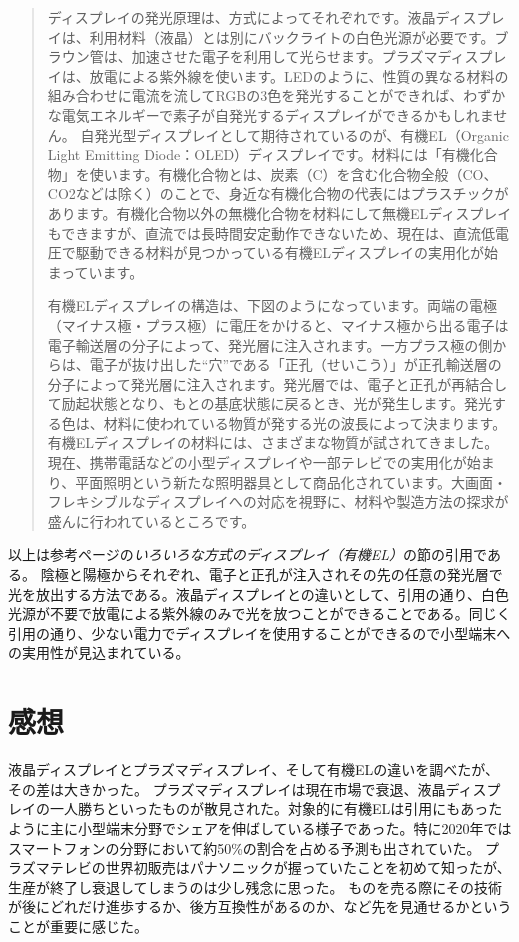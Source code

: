 \documentclass[uplatex]{jsarticle} %
\begin{document}
\begin{quotation}

  ディスプレイの発光原理は、方式によってそれぞれです。液晶ディスプレイは、利用材料（液晶）とは別にバックライトの白色光源が必要です。ブラウン管は、加速させた電子を利用して光らせます。プラズマディスプレイは、放電による紫外線を使います。LEDのように、性質の異なる材料の組み合わせに電流を流してRGBの3色を発光することができれば、わずかな電気エネルギーで素子が自発光するディスプレイができるかもしれません。
自発光型ディスプレイとして期待されているのが、有機EL（Organic Light Emitting Diode：OLED）ディスプレイです。材料には「有機化合物」を使います。有機化合物とは、炭素（C）を含む化合物全般（CO、CO2などは除く）のことで、身近な有機化合物の代表にはプラスチックがあります。有機化合物以外の無機化合物を材料にして無機ELディスプレイもできますが、直流では長時間安定動作できないため、現在は、直流低電圧で駆動できる材料が見つかっている有機ELディスプレイの実用化が始まっています。

  有機ELディスプレイの構造は、下図のようになっています。両端の電極（マイナス極・プラス極）に電圧をかけると、マイナス極から出る電子は電子輸送層の分子によって、発光層に注入されます。一方プラス極の側からは、電子が抜け出した“穴”である「正孔（せいこう）」が正孔輸送層の分子によって発光層に注入されます。発光層では、電子と正孔が再結合して励起状態となり、もとの基底状態に戻るとき、光が発生します。発光する色は、材料に使われている物質が発する光の波長によって決まります。
有機ELディスプレイの材料には、さまざまな物質が試されてきました。現在、携帯電話などの小型ディスプレイや一部テレビでの実用化が始まり、平面照明という新たな照明器具として商品化されています。大画面・フレキシブルなディスプレイへの対応を視野に、材料や製造方法の探求が盛んに行われているところです。

\end{quotation}

以上は参考ページ\cite{sour}の\textit{いろいろな方式のディスプレイ（有機EL）}の節の引用である。
陰極と陽極からそれぞれ、電子と正孔が注入されその先の任意の発光層で光を放出する方法である。液晶ディスプレイとの違いとして、引用の通り、白色光源が不要で放電による紫外線のみで光を放つことができることである。同じく引用の通り、少ない電力でディスプレイを使用することができるので小型端末への実用性が見込まれている。

\section{感想}

液晶ディスプレイとプラズマディスプレイ、そして有機ELの違いを調べたが、その差は大きかった。
プラズマディスプレイは現在市場で衰退、液晶ディスプレイの一人勝ちといったものが散見された。対象的に有機ELは引用にもあったように主に小型端末分野でシェアを伸ばしている様子であった。特に2020年ではスマートフォンの分野において約50\%の割合を占める予測も出されていた。\cite{trend1}
プラズマテレビの世界初販売はパナソニックが握っていたこと\cite{trend2}を初めて知ったが、生産が終了し衰退してしまうのは少し残念に思った。
ものを売る際にその技術が後にどれだけ進歩するか、後方互換性があるのか、など先を見通せるかということが重要に感じた。
\end{document}
